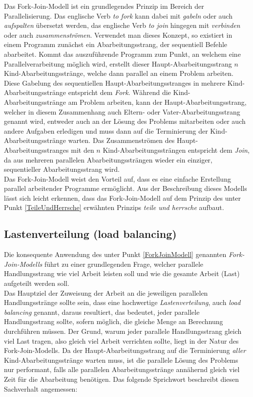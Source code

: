 			Das Fork-Join-Modell ist ein grundlegendes Prinzip im Bereich der Parallelisierung.
			Das englische Verb \textit{to fork} kann dabei mit \textit{gabeln} oder auch \textit{aufspalten} übersetzt werden, das englische Verb \textit{to join} hingegen mit \textit{verbinden} oder auch \textit{zusammenströmen}. Verwendet man dieses Konzept, so existiert in einem Programm zunächst ein Abarbeitungsstrang, der sequentiell Befehle abarbeitet. Kommt das auszuführende Programm zum Punkt, an welchem eine Parallelverarbeitung möglich wird, erstellt dieser Haupt-Abarbeitungsstrang $n$ Kind-Abarbeitungsstränge, welche dann parallel an einem Problem arbeiten. Diese Gabelung des sequentiellen Haupt-Abarbeitungsstranges in mehrere Kind-Abarbeitungsstränge entspricht dem \textit{Fork}. Während die Kind-Abarbeitungsstränge am Problem arbeiten, kann der Haupt-Abarbeitungsstrang, welcher in diesem Zusammenhang auch Eltern- oder Vater-Abarbeitungsstrang genannt wird, entweder auch an der Lösung des Problems mitarbeiten oder auch andere Aufgaben erledigen und muss dann auf die Terminierung der Kind-Abarbeitungsstränge warten. Das Zusammenströmen des Haupt-Abarbeitungsstranges mit den $n$ Kind-Abarbeitungssträngen entspricht dem \textit{Join}, da aus mehreren parallelen Abarbeitungssträngen wieder ein einziger, sequentieller Abarbeitungsstrang wird.\\
			Das Fork-Join-Modell weist den Vorteil auf, dass es eine einfache Erstellung parallel arbeitender Programme ermöglicht\cite{ParaProgRauber}. Aus der Beschreibung dieses Modells lässt sich leicht erkennen, dass das Fork-Join-Modell auf dem Prinzip des unter Punkt \ref{TeileUndHerrsche} erwähnten Prinzips \textit{teile und herrsche} aufbaut.

		\subsection{Lastenverteilung (load balancing)}
			\label{Lastenverteilung}
		
			Die konsequente Anwendung des unter Punkt \ref{ForkJoinModell} genannten \textit{Fork-Join-Modells} führt zu einer grundlegenden Frage, welcher parallele Handlungsstrang wie viel Arbeit leisten soll und wie die gesamte Arbeit (Last) aufgeteilt werden soll.\\
			Das Hauptziel der Zuweisung der Arbeit an die jeweiligen parallelen Handlungsstränge sollte sein, dass eine hochwertige \textit{Lastenverteilung}, auch \textit{load balancing} genannt, daraus resultiert, das bedeutet, jeder parallele Handlungsstrang sollte, sofern möglich, die gleiche Menge an Berechnung durchführen müssen. \cite{ParaProgRauber}
			Der Grund, warum jeder parallele Handlungsstrang gleich viel Last tragen, also gleich viel Arbeit verrichten sollte, liegt in der Natur des Fork-Join-Modells. Da der Haupt-Abarbeitungsstrang auf die Terminierung \textit{aller} Kind-Abarbeitungsstränge warten muss, ist die parallele Lösung des Problems nur performant, falls alle parallelen Abarbeitungsstränge annähernd gleich viel Zeit für die Abarbeitung benötigen. Das folgende Sprichwort beschreibt diesen Sachverhalt angemessen:
			
